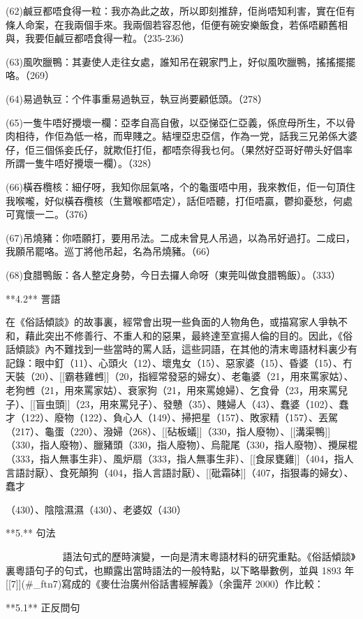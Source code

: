 (62)鹹豆都唔食得一粒：我亦為此之故，所以即刻推辞，佢尚唔知利害，實在佢有條人命案，在我兩個手來。我兩個若容忍他，佢便有碗安樂飯食，若係唔顧舊相與，我要佢鹹豆都唔食得一粒。（235-236）

(63)風吹臘鴨：其妻使人走往女處，誰知吊在親家門上，好似風吹臘鴨，搖搖擺擺咯。（269）

(64)易過執豆：个件事重易過執豆，執豆尚要顧低頭。（278）

(65)一隻牛唔好攪壞一欄：亞孝自高自傲，以亞悌亞仁亞義，係庶母所生，不以骨肉相待，作佢為低一格，而卑賤之。結埋亞忠亞信，作為一党，話我三兄弟係大婆仔，佢三個係妾氏仔，就欺佢打佢，都唔奈得我乜何。（果然好亞哥好帶头好倡率所謂一隻牛唔好攪壞一欄）。（328）

(66)橫吞欖核：細仔呀，我知你屈氣咯，个的龜蛋唔中用，我來教佢，佢一句頂住我喉嚨，好似橫吞欖核（生鵞喉都唔定），話佢唔聽，打佢唔贏，鬱抑憂愁，何處可寬懷一二。（376）

(67)吊燒豬：你唔願打，要用吊法。二成未曾見人吊過，以為吊好過打。二成曰，我願吊罷咯。巡丁將他吊起，名為吊燒豬。（66）

(68)食腊鴨飯：各人整定身勢，今日去攞人命呀（東莞叫做食腊鴨飯）。（333）

**4.2** 詈語

在《俗話傾談》的故事裏，經常會出現一些負面的人物角色，或描寫家人爭執不和，藉此突出不修善行、不重人和的惡果，最終達至宣揚人倫的目的。因此，《俗話傾談》內不難找到一些當時的罵人話，這些詞語，在其他的清末粵語材料裏少有記錄：眼中釘（11）、心頭火（12）、壞鬼女（15）、惡家婆（15）、昏婆（15）、冇天裝（20）、[[霸巷雞乸]]（20，指經常發惡的婦女）、老龜婆（21，用來罵家姑）、老狗乸（21，用來罵家姑）、衰家狗（21，用來罵媳婦）、乞食骨（23，用來罵兒子）、[[盲虫頭]]（23，用來罵兒子）、發戇（35）、賤婦人（43）、蠢婆（102）、蠢才（122）、廢物（122）、負心人（149）、掃把星（157）、敗家精（157）、丟駕（217）、龜蛋（220）、潑婦（268）、[[砧板蟻]]（330，指人廢物）、[[溝渠鴨]]（330，指人廢物）、臘豬頭（330，指人廢物）、烏龍尾（330，指人廢物）、攪屎棍（333，指人無事生非）、風炉扇（333，指人無事生非）、[[食尿甕雞]]（404，指人言語討厭）、食死顛狗（404，指人言語討厭）、[[砒霜砵]]（407，指狠毒的婦女）、蠢才

（430）、陰陰濕濕（430）、老婆奴（430）

**5.** 句法

            語法句式的歷時演變，一向是清末粵語材料的研究重點。《俗話傾談》裏粵語句子的句式，也顯露出當時語法的一般特點，以下略舉數例，並與 1893 年[[7]](#_ftn7)寫成的《麥仕治廣州俗話書經解義》（余靄芹 2000）作比較：

**5.1** 正反問句

